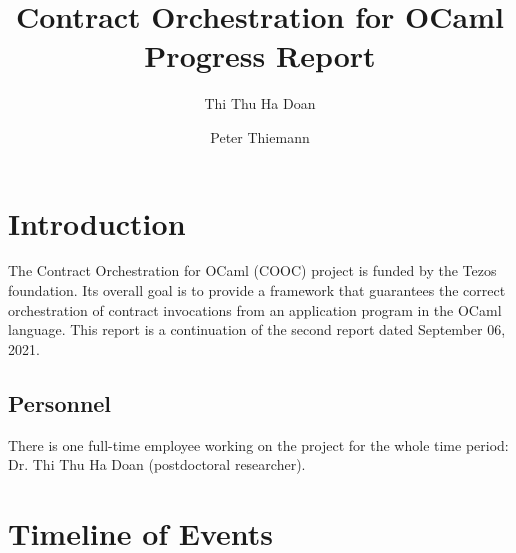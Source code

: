 \documentclass[a4paper,11pt]{article}
\title{Contract Orchestration for OCaml \\
  Progress Report 
}
\author{Thi Thu Ha Doan}
\author{Peter Thiemann}
\affil{University of Freiburg, Germany}
\begin{document}
\maketitle{}

\section{Introduction}
\label{sec:introduction}

The Contract Orchestration for OCaml (COOC) project is funded by the Tezos foundation. Its overall goal  is to provide a framework that guarantees the correct orchestration of contract invocations from an application program in the OCaml language. This report is a continuation of the second report dated September 06, 2021.

\subsection{Personnel}
\label{sec:personnel}

There is one full-time employee working on the project for the whole time period: Dr. Thi Thu Ha Doan (postdoctoral researcher). 
\section{Timeline of Events}
\label{sec:timeline-events}
\end{document}

